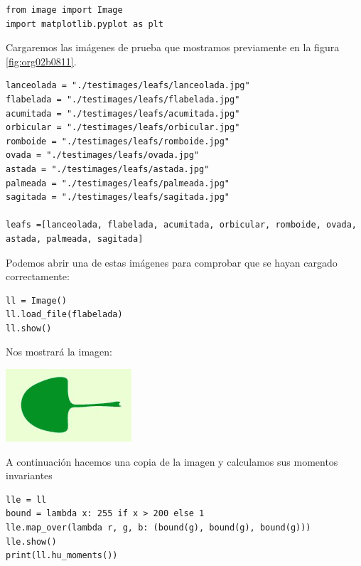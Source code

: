 \documentclass[letter]{article}
\begin{document}
\begin{verbatim}
from image import Image
import matplotlib.pyplot as plt
\end{verbatim}

Cargaremos las imágenes de prueba que mostramos previamente en la figura
\ref{fig:org02b0811}.

\begin{verbatim}
lanceolada = "./testimages/leafs/lanceolada.jpg"
flabelada = "./testimages/leafs/flabelada.jpg"
acumitada = "./testimages/leafs/acumitada.jpg"
orbicular = "./testimages/leafs/orbicular.jpg"
romboide = "./testimages/leafs/romboide.jpg"
ovada = "./testimages/leafs/ovada.jpg"
astada = "./testimages/leafs/astada.jpg"
palmeada = "./testimages/leafs/palmeada.jpg"
sagitada = "./testimages/leafs/sagitada.jpg"

leafs =[lanceolada, flabelada, acumitada, orbicular, romboide, ovada, astada, palmeada, sagitada]
\end{verbatim}

Podemos abrir una de estas imágenes para comprobar que se hayan cargado correctamente:

\begin{verbatim}
ll = Image()
ll.load_file(flabelada)
ll.show()
\end{verbatim}

Nos mostrará la imagen:

\begin{center}
\includegraphics[width=.9\linewidth]{./images/show.png}
\end{center}

A continuación hacemos una copia de la imagen y calculamos sus momentos invariantes

\begin{verbatim}
lle = ll
bound = lambda x: 255 if x > 200 else 1
lle.map_over(lambda r, g, b: (bound(g), bound(g), bound(g)))
lle.show()
print(ll.hu_moments())
\end{verbatim}
\end{document}
